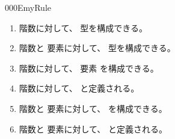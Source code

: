 \documentclass[index]{subfiles}
\begin{document}
\begin{myBlock}{000E}{myRule}
  \begin{enumerate}
  \item 階数に対して、
    型を構成できる。
  \item 階数と
    要素に対して、
    型を構成できる。
  \item 階数に対して、
    要素
    を構成できる。
  \item 階数に対して、
    と定義される。
  \item 階数と
    要素に対して、
    を構成できる。
  \item 階数と
    要素に対して、
    と定義される。
  \end{enumerate}
\end{myBlock}
\end{document}
